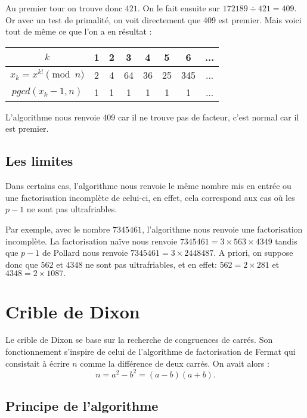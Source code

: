 \documentclass[french, 12pt, titlepage]{article}
\begin{document}
Au premier tour on trouve donc $421.$ On le fait ensuite sur $172189 \div 421 = 409.$ Or avec un test de primalité, on voit directement que 409 est premier. Mais voici tout de même ce que l'on a en résultat : 

\begin{center}
\begin{tabular}{|c||c|c|c|c|c|c|c|}
\hline
$k$ & 1 & 2 & 3 & 4 & 5 & 6 & ... \\
\hline
$x_k = x^{k!} \pmod n$ & 2 & 4 & 64 & 36 & 25 & 345 & ... \\
\hline
$pgcd(x_k -1, n)$ & 1 & 1 & 1 & 1 & 1 & 1 & ...\\
\hline
\end{tabular}
\end{center}

L'algorithme nous renvoie 409 car il ne trouve pas de facteur, c'est normal car il est premier.

\subsection{Les limites}

Dans certains cas, l'algorithme nous renvoie le même nombre mis en entrée ou une factorisation incomplète de celui-ci, en effet, cela correspond aux cas où les $p-1$ ne sont pas ultrafriables.

Par exemple, avec le nombre $7345461$, l'algorithme nous renvoie une factorisation incomplète.
La factorisation naïve nous renvoie $7345461 = 3 \times 563 \times 4349$ tandis que $p-1$ de Pollard nous renvoie $7345461 = 3 \times 2448487.$
A priori, on suppose donc que $562$ et $4348$ ne sont pas ultrafriables, et en effet:
$562 = 2 \times 281$ et $4348 = 2 \times 1087.$



\section{Crible de Dixon}

Le crible de Dixon se base sur la recherche de congruences de
carrés. Son fonctionnement s'inspire de celui de l'algorithme de
factorisation de Fermat qui consistait à écrire $n$ comme la
différence de deux carrés. On avait alors : \[n = a^2 - b^2 = (a - b)(a + b).\]

\subsection{Principe de l'algorithme}
\end{document}
